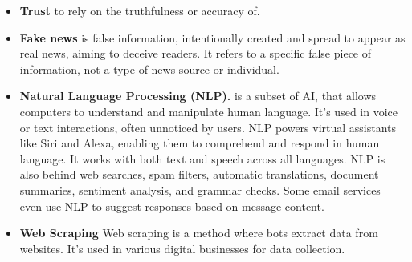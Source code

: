 \begin{refsection}
\begin{itemize}
    \item \textbf{Trust} to rely on the truthfulness or accuracy of.\cite{trust}
    \item \textbf{Fake news} is false information, intentionally created and spread to appear as real news, aiming to deceive readers. It refers to a specific false piece of information, not a type of news source or individual.\cite{cunningham_fake-news}
    \item \textbf{Natural Language Processing (NLP).} is a subset of AI, that allows computers to understand and manipulate human language. It’s used in voice or text interactions, often unnoticed by users. NLP powers virtual assistants like Siri and Alexa, enabling them to comprehend and respond in human language. It works with both text and speech across all languages. NLP is also behind web searches, spam filters, automatic translations, document summaries, sentiment analysis, and grammar checks. Some email services even use NLP to suggest responses based on message content.\cite{nlp}
    \item \textbf{Web Scraping} Web scraping is a method where bots extract data from websites. It’s used in various digital businesses for data collection.\cite{web_scraping}
\end{itemize}

\clearpage

\printbibliography[heading=subbibintoc, title={\centering Notes}]
\end{refsection}